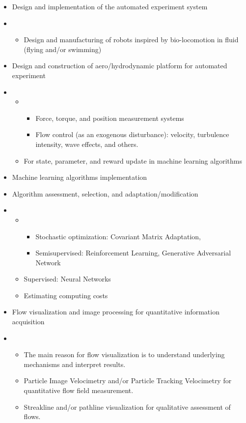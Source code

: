 \documentclass[12pt, a4paper]{article}
\providecommand{\tightlist}{%
  \setlength{\itemsep}{0pt}\setlength{\parskip}{0pt}}
\begin{document}
\begin{itemize}
\item
  Design and implementation of the automated experiment system
\item
  \begin{itemize}
  \tightlist
  \item
    Design and manufacturing of robots inspired by bio-locomotion in
    fluid (flying and/or swimming)
  \end{itemize}
\item
  Design and construction of aero/hydrodynamic platform for automated
  experiment
\item
  \begin{itemize}
  \item
    \begin{itemize}
    \tightlist
    \item
      Force, torque, and position measurement systems
    \item
      Flow control (as an exogenous disturbance): velocity, turbulence
      intensity, wave effects, and others.
    \end{itemize}
  \item
    For state, parameter, and reward update in machine learning
    algorithms
  \end{itemize}
\item
  Machine learning algorithms implementation
\item
  Algorithm assessment, selection, and adaptation/modification
\item
  \begin{itemize}
  \item
    \begin{itemize}
    \tightlist
    \item
      Stochastic optimization: Covariant Matrix Adaptation,
    \item
      Semisupervised: Reinforcement Learning, Generative Adversarial
      Network
    \end{itemize}
  \item
    Supervised: Neural Networks
  \item
    Estimating computing costs
  \end{itemize}
\item
  Flow visualization and image processing for quantitative information
  acquisition
\item
  \begin{itemize}
  \tightlist
  \item
    The main reason for flow visualization is to understand underlying
    mechanisms and interpret results.
  \item
    Particle Image Velocimetry and/or Particle Tracking Velocimetry for
    quantitative flow field measurement.
  \item
    Streakline and/or pathline visualization for qualitative assessment
    of flows.
  \end{itemize}
\end{itemize}
\end{document}
